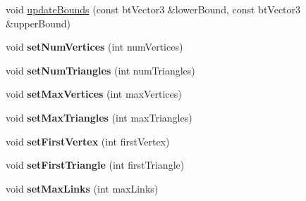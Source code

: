\begin{DoxyCompactItemize}
\item 
void \hyperlink{classbt_d_x11_soft_body_solver_1_1bt_accelerated_soft_body_interface_ace99e4c1e9cbb3a08e5d1d2688fc02e2}{update\+Bounds} (const bt\+Vector3 \&lower\+Bound, const bt\+Vector3 \&upper\+Bound)
\item 
\hypertarget{classbt_d_x11_soft_body_solver_1_1bt_accelerated_soft_body_interface_a9356bdddcdc88710ea506ffe90b1086b}{void {\bfseries set\+Num\+Vertices} (int num\+Vertices)}\label{classbt_d_x11_soft_body_solver_1_1bt_accelerated_soft_body_interface_a9356bdddcdc88710ea506ffe90b1086b}

\item 
\hypertarget{classbt_d_x11_soft_body_solver_1_1bt_accelerated_soft_body_interface_af9954a8f4eb53a374969e7879ee7e009}{void {\bfseries set\+Num\+Triangles} (int num\+Triangles)}\label{classbt_d_x11_soft_body_solver_1_1bt_accelerated_soft_body_interface_af9954a8f4eb53a374969e7879ee7e009}

\item 
\hypertarget{classbt_d_x11_soft_body_solver_1_1bt_accelerated_soft_body_interface_a3c9ad48eb9011b2e5d8639cbf764b483}{void {\bfseries set\+Max\+Vertices} (int max\+Vertices)}\label{classbt_d_x11_soft_body_solver_1_1bt_accelerated_soft_body_interface_a3c9ad48eb9011b2e5d8639cbf764b483}

\item 
\hypertarget{classbt_d_x11_soft_body_solver_1_1bt_accelerated_soft_body_interface_a70c846da231c446864dea0adfbd7be84}{void {\bfseries set\+Max\+Triangles} (int max\+Triangles)}\label{classbt_d_x11_soft_body_solver_1_1bt_accelerated_soft_body_interface_a70c846da231c446864dea0adfbd7be84}

\item 
\hypertarget{classbt_d_x11_soft_body_solver_1_1bt_accelerated_soft_body_interface_a3a0bd4b87e80af3e53bb09ec1fbc3097}{void {\bfseries set\+First\+Vertex} (int first\+Vertex)}\label{classbt_d_x11_soft_body_solver_1_1bt_accelerated_soft_body_interface_a3a0bd4b87e80af3e53bb09ec1fbc3097}

\item 
\hypertarget{classbt_d_x11_soft_body_solver_1_1bt_accelerated_soft_body_interface_a961605b672e8fd9df9c5d987de524555}{void {\bfseries set\+First\+Triangle} (int first\+Triangle)}\label{classbt_d_x11_soft_body_solver_1_1bt_accelerated_soft_body_interface_a961605b672e8fd9df9c5d987de524555}

\item 
\hypertarget{classbt_d_x11_soft_body_solver_1_1bt_accelerated_soft_body_interface_a8a984f7a1636cc40d8047936e60f1b96}{void {\bfseries set\+Max\+Links} (int max\+Links)}\label{classbt_d_x11_soft_body_solver_1_1bt_accelerated_soft_body_interface_a8a984f7a1636cc40d8047936e60f1b96}


\end{DoxyCompactItemize}
